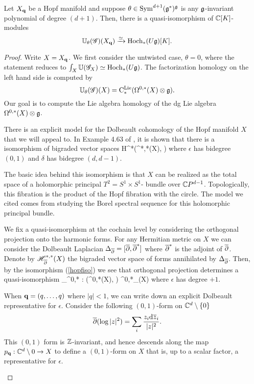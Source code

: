 \begin{prop}
\label{prop: hopf}
Let $X_{\bf q}$ be a Hopf manifold and suppose $\theta \in {\rm Sym}^{d+1}(\mathfrak g^*)^\mathfrak g$ is any $\mathfrak g$-invariant polynomial of degree $(d+1)$. 
Then, there is a quasi-isomorphism of $\mathbb C[K]$-modules
\[
\mathbb U_\theta (\mathscr G) (X_{\bf q}) \xrightarrow{\simeq} {\rm Hoch}_*(U \mathfrak g)[K] .
\]
\end{prop}
\begin{proof}
Write $X = X_{\bf q}$. 
We first consider the untwisted case, $\theta = 0$, where the statement reduces to $\int_X \mathbb U (\mathscr G_X) \simeq {\rm Hoch}_*(U \mathfrak g)$.
The factorization homology on the left hand side is computed by
\[
\mathbb U_\theta (\mathscr G) (X) = {\rm C}^{\rm Lie}_*(\Omega^{0,*}(X) \otimes \mathfrak g) .
\]
Our goal is to compute the Lie algebra homology of the dg Lie algebra $\Omega^{0,*}(X) \otimes \mathfrak g$.  

There is an explicit model for the Dolbeault cohomology of the Hopf manifold $X$ that we will appeal to. 
In Example 4.63 of \cite{Tanre}, it is shown that there is a isomorphism of bigraded vector spaces
\beqn\label{hopfiso}
H^*\left(\Omega^{*,*}(X), \dbar\right) \cong \CC[\epsilon,\delta]
\eeqn
where $\epsilon$ has bidegree $(0,1)$ and $\delta$ has bidegree $(d,d-1)$. 

\begin{rmk}
The basic idea behind this isomorphism is that $X$ can be realized as the total space of a holomorphic principal $T^2 = S^1 \times S^1$- bundle over $\mathbb C P^{d-1}$. 
Topologically, this fibration is the product of the Hopf fibration with the circle. 
The model we cited comes from studying the Borel spectral sequence for this holomorphic principal bundle.
\end{rmk}

We fix a quasi-isomorphism at the cochain level by considering the orthogonal projection onto the harmonic forms. 
For any Hermitian metric on $X$ we can consider the Dolbeault Laplacian $\Delta_{\overline{\partial}} = [\overline{\partial},\overline{\partial}^*]$ where $\overline{\partial}^*$ is the adjoint of $\overline{\partial}$.
Denote by $\mathscr H^{*,*}_{\overline{\partial}}(X)$ the bigraded vector space of forms annihilated by $\Delta_{\overline{\partial}}$. 
Then, by the isomorphism (\ref{hopfiso}) we see that orthogonal projection determines a quasi-isomorphism
\beqn\label{hopfquasi}
\pi_{\sH}^{0,*} : \left(\Omega^{0,*}(X), \dbar \right) \xto{\simeq} \sH^{0,*}_{\dbar}(X) \cong \CC[\epsilon]
\eeqn
where $\epsilon$ has degree $+1$. 


\begin{eg}
When ${\bf q} = (q,\ldots,q)$ where $|q| < 1$, we can write down an explicit Dolbeault representative for $\epsilon$. 
Consider the following $(0,1)$-form on $\mathbb C^d \setminus \{0\}$
\[
\overline{\partial} (\log |z|^2) = \sum_i \frac{z_i{\rm d} \overline{z}_i}{|z|^2} .
\]
This $(0,1)$ form is $\mathbb Z$-invariant, and hence descends along the map $p_{\bf q} : \mathbb C^d \setminus 0 \to X$ to define a $(0,1)$-form on $X$ that is, up to a scalar factor, a representative for $\epsilon$. 
\end{eg}


\end{proof}
